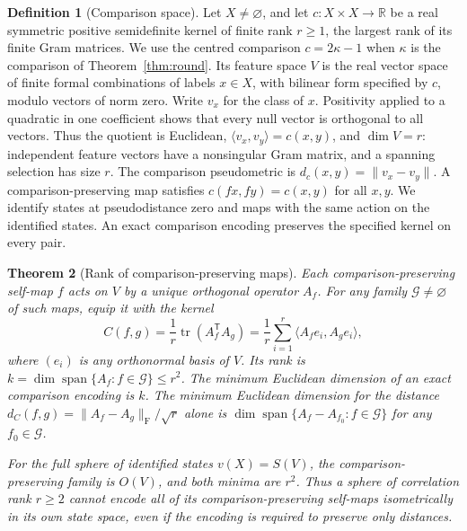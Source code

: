 \documentclass[11pt,reqno]{amsart}
\newtheorem{theorem}{Theorem}[section]
\theoremstyle{definition}
\newtheorem{definition}[theorem]{Definition}
\theoremstyle{remark}
\numberwithin{equation}{section}
\begin{document}
\begin{definition}[Comparison space]\label{d4:def}
Let \(X\ne\varnothing\), and let \(c:X\times X\to\mathbb R\) be a real
symmetric positive semidefinite kernel of finite rank \(r\ge1\), the largest
rank of its finite Gram matrices. We use the centred comparison
\(c=2\kappa-1\) when \(\kappa\) is the comparison of
Theorem~\ref{thm:round}. Its feature space \(V\) is the real vector space of
finite formal combinations of labels \(x\in X\), with bilinear form specified
by \(c\), modulo vectors of norm zero. Write \(v_x\) for the class of \(x\).
Positivity applied to a quadratic in one coefficient shows that every
null vector is orthogonal to all vectors. Thus the quotient is Euclidean,
\(\langle v_x,v_y\rangle=c(x,y)\), and \(\dim V=r\): independent feature
vectors have a nonsingular Gram matrix, and a spanning selection has size
\(r\). The comparison pseudometric is \(d_c(x,y)=\|v_x-v_y\|\). A
comparison-preserving map satisfies \(c(fx,fy)=c(x,y)\) for all \(x,y\).
We identify states at pseudodistance zero and maps with the same action on
the identified states. An exact comparison encoding preserves the
specified kernel on every pair.
\end{definition}

\begin{theorem}[Rank of comparison-preserving maps]\label{d4:rank}
Each comparison-preserving self-map \(f\) acts on \(V\) by a unique orthogonal
operator \(A_f\). For any family \(\mathcal G\ne\varnothing\) of such maps,
equip it with the kernel
\begin{equation}\label{d4:mapkernel}
 C(f,g)=\frac1r\operatorname{tr}(A_f^{\mathsf T}A_g)
       =\frac1r\sum_{i=1}^r\langle A_f e_i,A_g e_i\rangle,
\end{equation}
where \((e_i)\) is any orthonormal basis of \(V\). Its rank is
\(k=\dim\operatorname{span}\{A_f:f\in\mathcal G\}\le r^2\). The minimum
Euclidean dimension of an exact comparison encoding is \(k\). The minimum
Euclidean dimension for the distance
\(d_C(f,g)=\|A_f-A_g\|_{\mathrm F}/\sqrt r\) alone is
\(\dim\operatorname{span}\{A_f-A_{f_0}:f\in\mathcal G\}\) for any
\(f_0\in\mathcal G\).

For the full sphere of identified states \(v(X)=S(V)\), the
comparison-preserving family is \(O(V)\), and
both minima are \(r^2\). Thus a sphere of correlation rank \(r\ge2\) cannot
encode all of its comparison-preserving self-maps isometrically in its own
state space, even if the encoding is required to preserve only distances.
\end{theorem}
\end{document}
